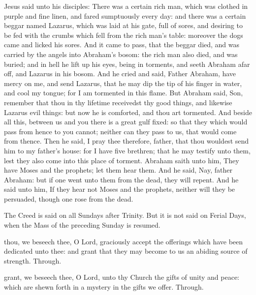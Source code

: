  Jesus said unto his disciples: There was a certain rich man, which was clothed in purple and fine linen, and fared sumptuously every day: and there was a certain beggar named Lazarus, which was laid at his gate, full of sores, and desiring to be fed with the crumbs which fell from the rich man's table: moreover the dogs came and licked his sores. And it came to pass, that the beggar died, and was carried by the angels into Abraham's bosom: the rich man also died, and was buried; and in hell he lift up his eyes, being in torments, and seeth Abraham afar off, and Lazarus in his bosom. And he cried and said, Father Abraham, have mercy on me, and send Lazarus, that he may dip the tip of his finger in water, and cool my tongue; for I am tormented in this flame. But Abraham said, Son, remember that thou in thy lifetime receivedst thy good things, and likewise Lazarus evil things: but now he is comforted, and thou art tormented. And beside all this, between us and you there is a great gulf fixed: so that they which would pass from hence to you cannot; neither can they pass to us, that would come from thence. Then he said, I pray thee therefore, father, that thou wouldest send him to my father's house: for I have five brethren; that he may testify unto them, lest they also come into this place of torment. Abraham saith unto him, They have Moses and the prophets; let them hear them. And he said, Nay, father Abraham: but if one went unto them from the dead, they will repent. And he said unto him, If they hear not Moses and the prophets, neither will they be persuaded, though one rose from the dead.

\begin{rubric}
    The Creed is said on all Sundays after Trinity. But it is not said on Ferial Days, when the Mass of the preceding Sunday is resumed.
\end{rubric}


\secret
{} thou, we beseech thee, O Lord, graciously accept the offerings which have been dedicated unto thee: and grant that they may become to us an abiding source of strength. Through.

 grant, we beseech thee, O Lord, unto thy Church the gifts of unity and peace: which are shewn forth in a mystery in the gifts we offer. Through.


